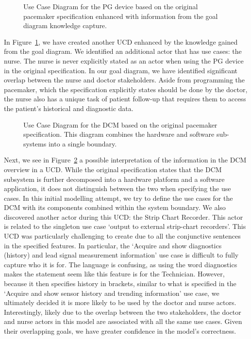 \begin{figure}
	\centering
	
	\caption{Use Case Diagram for the PG device based on the original pacemaker specification enhanced with information from the goal diagram knowledge capture.}
	\label{fig:pg_device_UCD}
\end{figure}

In Figure~\ref{fig:pg_device_UCD}, we have created another UCD enhanced by the knowledge gained from the goal diagram. We identified an additional actor that has use cases: the nurse. The nurse is never explicitly stated as an actor when using the PG device in the original specification. In our goal diagram, we have identified significant overlap between the nurse and doctor stakeholders. Aside from programming the pacemaker, which the specification explicitly states should be done by the doctor, the nurse also has a unique task of patient follow-up that requires them to access the patient's historical and diagnostic data. 

\begin{figure}
	\centering
	
	\caption{Use Case Diagram for the DCM based on the original pacemaker specification. This diagram combines the hardware and software sub-systems into a single boundary.}
	\label{fig:DCM_UCD_original_spec}
\end{figure}

Next, we see in Figure~\ref{fig:DCM_UCD_original_spec} a possible interpretation of the information in the DCM overview in a UCD. While the original specification states that the DCM subsystem is further decomposed into a hardware platform and a software application, it does not distinguish between the two when specifying the use cases. In this initial modelling attempt, we try to define the use cases for the DCM with its components combined within the system boundary. We also discovered another actor during this UCD: the Strip Chart Recorder. This actor is related to the singleton use case `output to external strip-chart recorders'. This UCD was particularly challenging to create due to all the conjunctive sentences in the specified features. In particular, the `Acquire and show diagnostics (history) and lead signal measurement information' use case is difficult to fully capture who it is for. The language is confusing, as using the word diagnostics makes the statement seem like this feature is for the Technician. However, because it then specifies history in brackets, similar to what is specified in the `Acquire and show sensor history and trending information' use case, we ultimately decided it is more likely to be used by the doctor and nurse actors. Interestingly, likely due to the overlap between the two stakeholders, the doctor and nurse actors in this model are associated with all the same use cases. Given their overlapping goals, we have greater confidence in the model's correctness.

